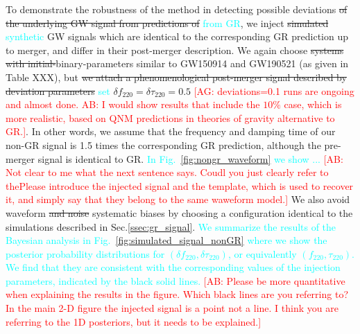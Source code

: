 \documentclass[twocolumn,prd,aps,superscriptaddress,preprintnumbers,tightenlines,showpacs,nofootinbib,eqsecnum,amsfonts,amsmath]{revtex4-1}
\newcommand{\ab}[1]{\textcolor{cyan}{#1}}
\newcommand{\comment}[1]{\textcolor{red}{[#1]}}
\newcommand{\df}[1]{\delta f_{\text{#1}}}
\newcommand{\dtau}[1]{\delta \tau_{\text{#1}}}
\newcommand{\fngr}[1]{f_{\text{#1}}}
\newcommand{\taungr}[1]{\tau_{\text{#1}}}
\begin{document}
To demonstrate the robustness of the method in detecting possible
deviations \sout{of the underlying GW signal from predictions of} \ab{from GR}, 
we inject \sout{simulated} \ab{synthetic} GW signals which are identical to 
the corresponding GR prediction up to merger, and differ in their post-merger
description. We again choose \sout{systems with initial-}binary-parameters
similar to GW150914 and GW190521 (as given in Table XXX), but 
\sout{we attach a phenomenological post-merger signal described by deviation parameters} 
\ab{set} $\df{220} = \dtau{220} = 0.5$ \comment{AG: deviations=0.1 runs are ongoing and almost
  done. AB: I would show results that include the $10\%$ case, which is more realistic, 
based on QNM predictions in theories of gravity alternative to GR.}. 
In other words, we assume that the frequency and damping time
of our non-GR signal is 1.5 times the corresponding GR prediction,
although the pre-merger signal is identical to GR. \ab{In Fig.~\ref{fig:nongr_waveform} 
we show ...}  \comment{AB: Not clear to me what the next sentence says. Coudl 
you just clearly refer to thePlease introduce the injected signal and the template, which is used 
to recover it, and simply say that they belong to the same waweform model.} 
We also avoid waveform \sout{and noise} systematic biases by choosing 
a configuration identical to the simulations described in Sec.\ref{ssec:gr_signal}. \ab{We 
summarize the results of the Bayesian analysis in Fig.~\ref{fig:simulated_signal_nonGR} where we 
show the posterior probability distributions for $(\df{220}, \dtau{220})$, or equivalently
$(\fngr{220}, \taungr{220})$. We find that they are consistent with the corresponding 
values of the injection parameters, indicated by the black solid lines.} \comment{AB: Please be more quantitative when 
explaining the results in the figure. Which black lines are you referring to? In the main 2-D figure the injected signal 
is a point not a line. I think you are referring to the 1D posteriors, but it needs to be explained.}
\end{document}
